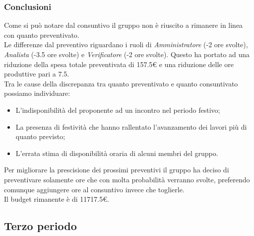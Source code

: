 \subsubsection{Conclusioni}
Come si può notare dal consuntivo il gruppo non è riuscito a rimanere in linea con quanto preventivato.
\\Le differenze dal preventivo riguardano i ruoli di \textit{Amministratore} (-2 ore svolte), \textit{Analista} (-3.5 ore svolte) e \textit{Verificatore} (-2 ore svolte).
Questo ha portato ad una riduzione della spesa totale preventivata di 157.5€ e una riduzione delle ore produttive pari a 7.5.
\\Tra le cause della discrepanza tra quanto preventivato e quanto consuntivato possiamo individuare:
    \begin{itemize}
        \item L'indisponibilità del proponente ad un incontro nel periodo festivo;
        \item La presenza di festività che hanno rallentato l'avanzamento dei lavori più di quanto previsto;
        \item L'errata stima di disponibilità oraria di alcuni membri del gruppo.
    \end{itemize}
Per migliorare la prescisione dei prossimi preventivi il gruppo ha deciso di preventivare solamente ore che con molta probabilità verranno svolte,
preferendo comunque aggiungere ore al consuntivo invece che toglierle.
\\Il budget rimanente è di \num{11717,5}€.


\subsection{Terzo periodo}

